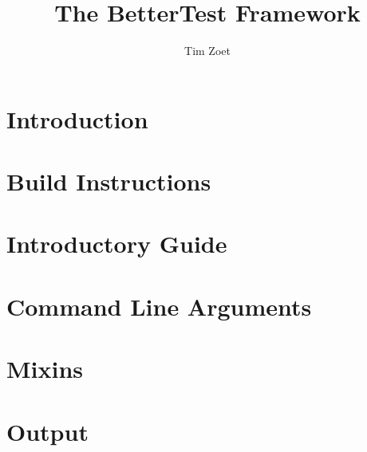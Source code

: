 \documentclass[twoside,a4paper,smallborder=true]{refart}
\title{The BetterTest Framework}
\author{Tim Zoet}
\date{}
\begin{document}
\maketitle

\tableofcontents
\newpage

\section{Introduction}
\label{section:introduction}

\newpage

\section{Build Instructions}
\label{section:build}

\newpage

\section{Introductory Guide}
\label{section:guide}

\newpage

\section{Command Line Arguments}
\label{section:cmd}

\newpage

\section{Mixins}
\label{section:mixins}

\newpage

\section{Output}
\label{section:output}

\newpage

 
 
\printindex
\end{document}
